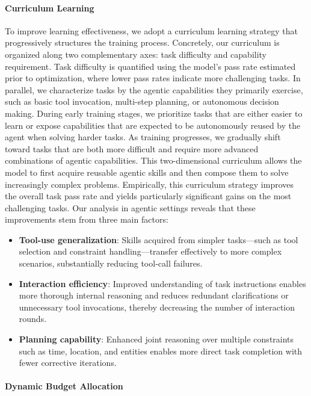 \documentclass{article}
\begin{document}
\paragraph{Curriculum Learning}
To improve learning effectiveness, we adopt a curriculum learning strategy that progressively structures the training process.
Concretely, our curriculum is organized along two complementary axes: task difficulty and capability requirement.
Task difficulty is quantified using the model’s pass rate estimated prior to optimization, where lower pass rates indicate more challenging tasks.
In parallel, we characterize tasks by the agentic capabilities they primarily exercise, such as basic tool invocation, multi-step planning, or autonomous decision making.
During early training stages, we prioritize tasks that are either easier to learn or expose capabilities that are expected to be autonomously reused by the agent when solving harder tasks.
As training progresses, we gradually shift toward tasks that are both more difficult and require more advanced combinations of agentic capabilities.
This two-dimensional curriculum allows the model to first acquire reusable agentic skills and then compose them to solve increasingly complex problems.
Empirically, this curriculum strategy improves the overall task pass rate and yields particularly significant gains on the most challenging tasks.
Our analysis in agentic settings reveals that these improvements stem from three main factors:
\begin{itemize}
    \item \textbf{Tool-use generalization}:  
    Skills acquired from simpler tasks—such as tool selection and constraint handling—transfer effectively to more complex scenarios, substantially reducing tool-call failures.

    \item \textbf{Interaction efficiency}:  
    Improved understanding of task instructions enables more thorough internal reasoning and reduces redundant clarifications or unnecessary tool invocations, thereby decreasing the number of interaction rounds.
    
    \item \textbf{Planning capability}:  
    Enhanced joint reasoning over multiple constraints such as time, location, and entities enables more direct task completion with fewer corrective iterations.
\end{itemize}


\paragraph{Dynamic Budget Allocation}
\end{document}
